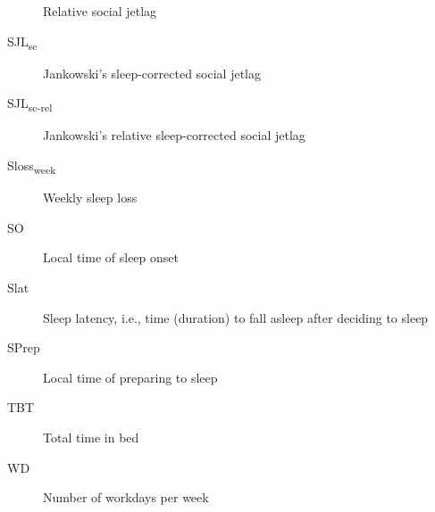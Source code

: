 \begin{siglas}
\begin{description}
Relative social jetlag
\item[SJL\textsubscript{sc}]
\hspace{20cm}

Jankowski's sleep-corrected social jetlag
\item[SJL\textsubscript{sc-rel}]
\hspace{20cm}

Jankowski's relative sleep-corrected social jetlag
\item[Sloss\textsubscript{week}]
\hspace{20cm}

Weekly sleep loss
\item[SO]
\hspace{20cm}

Local time of sleep onset
\item[Slat]
\hspace{20cm}

Sleep latency, i.e., time (duration) to fall asleep after deciding to
sleep
\item[SPrep]
\hspace{20cm}

Local time of preparing to sleep
\item[TBT]
\hspace{20cm}

Total time in bed
\item[WD]
\hspace{20cm}

Number of workdays per week
\end{description}

\end{siglas}


